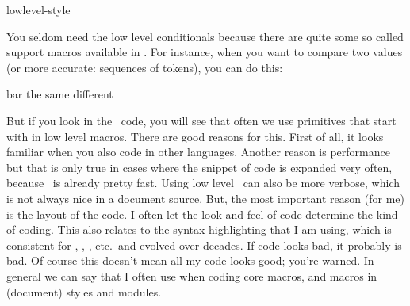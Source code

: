 
\environment lowlevel-style

\startdocument
  [title=conditionals,
   color=middleblue]

\pushoverloadmode

\startsectionlevel[title=Preamble]

\startsectionlevel[title=Introduction]

%

You seldom need the low level conditionals because there are quite some so called
support macros available in \CONTEXT . For instance, when you want to compare two
values (or more accurate: sequences of tokens), you can do this:

\starttyping[option=TEX]
 {bar} {
    the same
} {
    different
}
\stoptyping

But if you look in the \CONTEXT\ code, you will see that often we use primitives
that start with \type {\if} in low level macros. There are good reasons for this.
First of all, it looks familiar when you also code in other languages. Another
reason is performance but that is only true in cases where the snippet of code is
expanded very often, because \TEX\ is already pretty fast. Using low level \TEX\
can also be more verbose, which is not always nice in a document source. But, the
most important reason (for me) is the layout of the code. I often let the look
and feel of code determine the kind of coding. This also relates to the syntax
highlighting that I am using, which is consistent for \TEX, \METAPOST, \LUA,
etc.\ and evolved over decades. If code looks bad, it probably is bad. Of course
this doesn't mean all my code looks good; you're warned. In general we can say
that I often use \type {\if...} when coding core macros, and 
macros in (document) styles and modules.

